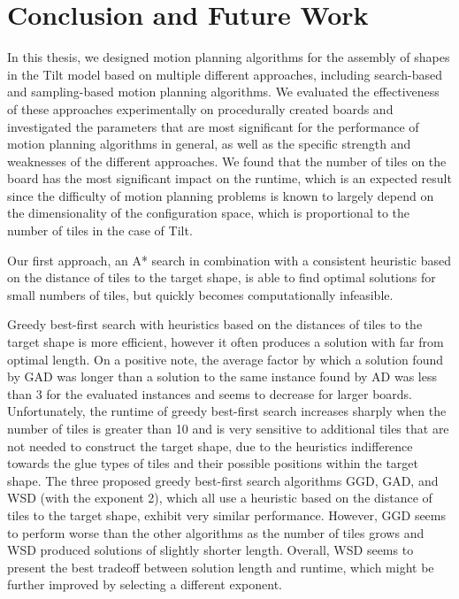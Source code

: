 \chapter{Conclusion and Future Work}
In this thesis, we designed motion planning algorithms for the assembly of shapes in the Tilt model based on multiple different approaches, including search-based and sampling-based motion planning algorithms. We evaluated the effectiveness of these approaches experimentally on procedurally created boards and investigated the parameters that are most significant for the performance of motion planning algorithms in general, as well as the specific strength and weaknesses of the different approaches.
We found that the number of tiles on the board has the most significant impact on the runtime, which is an expected result since the difficulty of motion planning problems is known to largely depend on the dimensionality of the configuration space, which is proportional to the number of tiles in the case of Tilt.\par
Our first approach, an A* search in combination with a consistent heuristic based on the distance of tiles to the target shape, is able to find optimal solutions for small numbers of tiles, but quickly becomes computationally infeasible.\par
Greedy best-first search with heuristics based on the distances of tiles to the target shape is more efficient, however it often produces a solution with far from optimal length. On a positive note, the average factor by which a solution found by GAD was longer than a solution to the same instance found by AD was less than 3 for the evaluated instances and seems to decrease for larger boards. Unfortunately, the runtime of greedy best-first search increases sharply when the number of tiles is greater than 10 and is very sensitive to additional tiles that are not needed to construct the target shape, due to the heuristics indifference towards the glue types of tiles and their possible positions within the target shape.
The three proposed greedy best-first search algorithms GGD, GAD, and WSD (with the exponent 2), which all use a heuristic based on the distance of tiles to the target shape, exhibit very similar performance. However, GGD seems to perform worse than the other algorithms as the number of tiles grows and WSD produced solutions of slightly shorter length. Overall, WSD seems to present the best tradeoff between solution length and runtime, which might be further improved by selecting a different exponent.\par

